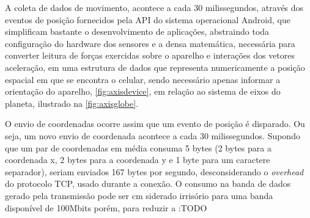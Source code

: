 A coleta de dados de movimento, acontece a cada 30 milissegundos, através dos eventos de posição fornecidos pela API do sistema operacional Android, que simplificam bastante o desenvolvimento de aplicações, abstraindo toda configuração do hardware dos sensores e a densa matemática, necessária para converter leitura de forças exercidas sobre o aparelho e interações dos vetores aceleração, em uma estrutura de dados que representa numericamente a posição espacial em que se encontra o celular, sendo necessário apenas informar a orientação do aparelho, \autoref{fig:axisdevice}, em relação ao sistema de eixos do planeta, ilustrado na \autoref{fig:axisglobe}.\par

O envio de coordenadas ocorre assim que um evento de posição é disparado. Ou seja, um novo envio de coordenada acontece a cada 30 milissegundos. Supondo que um par de coordenadas em média consuma 5 bytes (2 bytes para a coordenada x, 2 bytes para a coordenada y e 1 byte para um caractere separador), seriam enviados 167 bytes por segundo, desconsiderando o \textit{overhead} do protocolo TCP, usado durante a conexão. O consumo na banda de dados gerado pela transmissão pode ser cm siderado irrisório para uma banda disponível de 100Mbits porém, para reduzir a :TODO



  